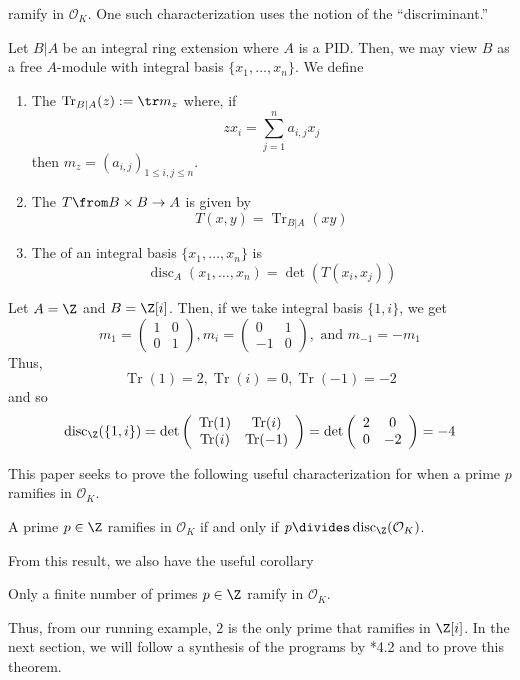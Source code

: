 \documentclass[11pt,leqno,oneside]{amsart}
\numberwithin{thm}{section}
\renewcommand{\O}{\mathcal{O}}
\newcommand{\disc}{\operatorname{disc}}
\newcommand{\Tr}{\operatorname{Tr}}
\begin{document}
ramify in \(\O_K\). One such characterization uses the notion of the ``discriminant.''
\begin{defn}
  Let \(B|A\) be an integral ring extension where \(A\) is a PID. Then, we may view \(B\)
  as a free \(A\)-module with integral basis \(\{x_1, \ldots,
  x_n\}\). We define
  \begin{enumerate}
  \item The  \(\Tr_{B|A}(z) := \tr m_z\) where, if \[
      zx_i = \sum_{j=1}^n a_{i,j} x_j
    \]
    then \(m_z = (a_{i,j})_{1 \leq i,j \leq n}\).
  \item The  \(T \from B \times B \to A\) is given
    by \[
      T(x,y) = \Tr_{B|A}(xy)
    \]
  \item The  of an integral basis \(\{x_1, \ldots,
    x_n\}\) is \[
      \disc_A(x_1, \ldots, x_n) = \det \left( T(x_i, x_j) \right)
    \] 
  \end{enumerate}
\end{defn}
\begin{example}
  Let \(A = \Z\) and \(B = \Z[i]\). Then, if we take integral basis
  \(\{1,i\}\), we get \[
    m_1 = \left(
      \begin{array}{cc}
        1&0\\
        0&1
      \end{array}
\right), m_i = \left(
  \begin{array}{cc}
    0&1\\
    -1&0
  \end{array}
\right), \text{ and } m_{-1} = -m_1
\]
Thus, \[
  \Tr(1) = 2, \Tr(i) = 0, \Tr(-1) = -2
\]
and so \[
  \disc_\Z(\{1,i\}) = \det \left(
    \begin{array}{cc}
      \Tr(1)&\Tr(i)\\
      \Tr(i)&\Tr(-1)
    \end{array}
\right) = \det \left(
  \begin{array}{cc}
    2&0\\
    0&-2
  \end{array}
\right) = -4
\]
\end{example}
This paper seeks to prove the following useful characterization for when a
prime \(p\) ramifies in \(\O_K\).
\begin{thm}\label{main-thm}
  A prime \(p \in \Z\) ramifies in \(\O_K\) if and only if \(p
  \divides \disc_\Z(\O_K)\). 
\end{thm}
From this result, we also have the useful corollary
\begin{cor}
  Only a finite number of primes \(p \in \Z\) ramify in \(\O_K\).
\end{cor}
Thus, from our running example, \(2\) is the only prime that ramifies
in \(\Z[i]\). In the next section, we will follow a synthesis of the
programs by \cite{ash}*{4.2} and \cite{conrad} to prove this theorem.
\end{document}

